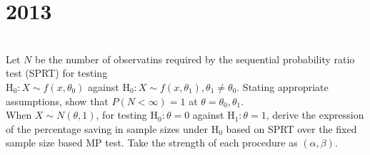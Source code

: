 \section*{2013}
\vspace{-.5cm}
\hrulefill \smallskip\\
 Let $N$ be the number of observatins required by the sequential probability ratio test (SPRT) for testing \\
$\text{H}_0 : X \sim f(x, \theta_0) $ against $\text{H}_0 : X \sim f(x, \theta_1), \theta_1 \neq \theta_0$. Stating appropriate assumptions, show that $P(N<\infty) = 1$ at $\theta = \theta_0,\theta_1$. \\
When $X\sim N(\theta,1)$, for testing $\text{H}_0 : \theta = 0 $ against $\text{H}_1 : \theta = 1 $, derive the expression of the percentage saving in sample sizes under $\text{H}_0 $ based on SPRT over the fixed sample size based MP test. Take the strength of each procedure as $(\alpha,\beta)$.